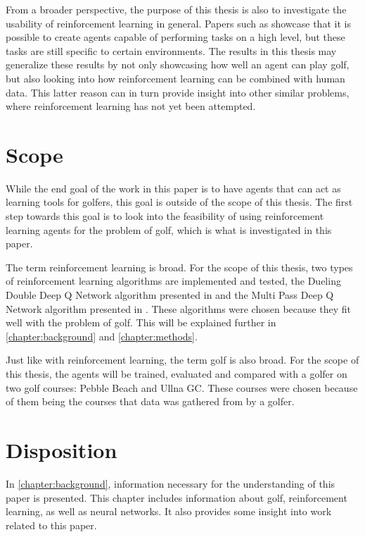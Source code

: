 \documentclass{kththesis}
\begin{document}
From a broader perspective, the purpose of this thesis is also to investigate the usability of reinforcement learning in general. Papers such as \parencite{mnih2015human} showcase that it is possible to create agents capable of performing tasks on a high level, but these tasks are still specific to certain environments. The results in this thesis may generalize these results by not only showcasing how well an agent can play golf, but also looking into how reinforcement learning can be combined with human data. This latter reason can in turn provide insight into other similar problems, where reinforcement learning has not yet been attempted. 

\section{Scope}
While the end goal of the work in this paper is to have agents that can act as learning tools for golfers, this goal is outside of the scope of this thesis. The first step towards this goal is to look into the feasibility of using reinforcement learning agents for the problem of golf, which is what is investigated in this paper.

The term reinforcement learning is broad. For the scope of this thesis, two types of reinforcement learning algorithms are implemented and tested, the Dueling Double Deep Q Network algorithm presented in \parencite{wang2015dueling} and the Multi Pass Deep Q Network algorithm presented in \parencite{bester2019mpdqn}. These algorithms were chosen because they fit well with the problem of golf. This will be explained further in \autoref{chapter:background} and \autoref{chapter:methods}.

Just like with reinforcement learning, the term golf is also broad. For the scope of this thesis, the agents will be trained, evaluated and compared with a golfer on two golf courses: Pebble Beach and Ullna GC. These courses were chosen because of them being the courses that data was gathered from by a golfer. 

\section{Disposition}
In \autoref{chapter:background}, information necessary for the understanding of this paper is presented. This chapter includes information about golf, reinforcement learning, as well as neural networks. It also provides some insight into work related to this paper.
\end{document}

